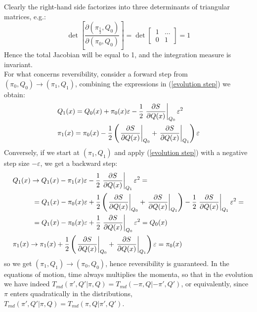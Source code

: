 Clearly the right-hand side factorizes into three determinants of triangular matrices, e.g.:
\begin{equation}
    \det[\frac{\partial(\pi_{\frac{1}{2}}, Q_0)}{\partial(\pi_0, Q_0)}] = \det\begin{bmatrix}
\,1 & \dots \\
\,0 & 1 
\end{bmatrix} = 1
\end{equation}
Hence the total Jacobian will be equal to 1, and the integration measure is invariant.
\\ For what concerns reversibility, consider a forward step from $(\pi_0, Q_0) \to (\pi_1, Q_1)$, combining the expressions in (\ref{evolution step}) we obtain:
\begin{equation}\label{step final app}
    \begin{split}
    & Q_1(x) = Q_0(x) + \pi_0(x) \varepsilon - \frac{1}{2} \left. \pdv{S}{Q(x)} \right\rvert_{Q_{0}} \varepsilon^2 \\
       & \pi_{1}(x) = \pi_{0}(x) - \frac{1}{2}\left( \left. \pdv{S}{Q(x)} \right\rvert_{Q_{0}} + \left. \pdv{S}{Q(x)} \right\rvert_{Q_{1}} \right) \varepsilon
    \end{split}
\end{equation}
Conversely, if we start at $(\pi_1, Q_1)$ and apply (\ref{evolution step}) with a negative step size $-\varepsilon$, we get a backward step:
\begin{equation}
    \begin{split}
           & Q_1(x) \to Q_1(x) - \pi_1(x) \varepsilon - \frac{1}{2} \left. \pdv{S}{Q(x)} \right\rvert_{Q_{1}} \varepsilon^2 = \\
           & \hspace{10mm} = Q_1(x) - \pi_0(x) \varepsilon + \frac{1}{2}\left( \left. \pdv{S}{Q(x)} \right\rvert_{Q_{0}} + \left. \pdv{S}{Q(x)} \right\rvert_{Q_{1}} \right)  -  \frac{1}{2} \left. \pdv{S}{Q(x)} \right\rvert_{Q_{1}} \varepsilon^2 = \\
           & \hspace{10mm} = Q_1(x) - \pi_0(x) \varepsilon + \frac{1}{2} \left. \pdv{S}{Q(x)} \right\rvert_{Q_{0}} \varepsilon^2 = Q_0(x)  \\
        & \pi_1(x) \to \pi_{1}(x) + \frac{1}{2}\left( \left. \pdv{S}{Q(x)} \right\rvert_{Q_{0}} + \left. \pdv{S}{Q(x)} \right\rvert_{Q_{1}} \right) \varepsilon = \pi_0(x)
    \end{split}
\end{equation}
so we get $(\pi_1, Q_1) \to (\pi_0, Q_0)$, hence reversibility is guaranteed. In the equations of motion, time always multiplies the momenta, so that in the evolution we have indeed $T_{md}(\pi', Q' | \pi, Q) = T_{md}(-\pi, Q| -\pi', Q')$, or equivalently, since $\pi$ enters quadratically in the distributions, $T_{md}(\pi', Q' | \pi, Q) = T_{md}(\pi, Q| \pi', Q')$.
